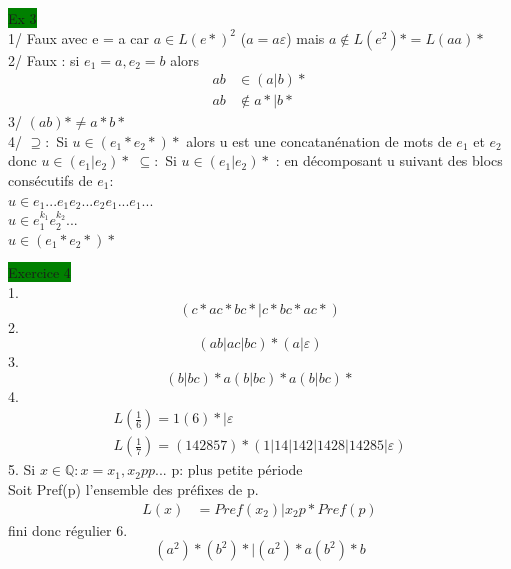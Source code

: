 \documentclass{article}
\begin{document}
\noindent \colorbox{green}{Ex 3}\\
1/ Faux avec e = a car \(a \in L(e*)^2\) (\(a = a \varepsilon\))
mais \(a \notin L(e^2)* = L(aa)*\)\\
2/ Faux : si \(e_1 = a, e_2 = b\) alors \begin{align*}
    ab &\in (a|b)*\\
    ab &\notin a*|b*
\end{align*}
3/ \((ab)* \neq a*b*\)\\
4/ \(\supseteq :\) Si \(u \in (e_1* e_2*)*\)
alors u est une concatanénation de mots de \(e_1\)
et \(e_2\) donc \(u \in (e_1|e_2)*\)
\(\subseteq :\) Si \(u \in (e_1 |e_2)*\) : 
en décomposant u suivant des blocs consécutifs de \(e_1\): \\
\(u \in e_1...e_1e_2...e_2e_1...e_1...\)\\
\(u \in e_1^{k_1}e_2^{k_2}...\)\\
\(u \in (e_1*e_2*)*\)

\noindent \colorbox{green}{Exercice 4}\\
1. \begin{equation*}
    (c*ac*bc*|c*bc*ac*)
\end{equation*}
2. \begin{equation*}
    (ab|ac|bc)*(a|\varepsilon)
\end{equation*}
3. \begin{equation*}
    (b|bc)*a(b|bc)*a(b|bc)*
\end{equation*}
4. \begin{eqnarray*}
    L(\frac{1}{6}) = 1(6)*|\varepsilon\\
    L(\frac{1}{7}) = (142857)*(1|14|142|1428|14285|\varepsilon)
\end{eqnarray*}
5. Si \(x \in \mathbb{Q} : x=x_1, x_2 pp...\) p: plus petite période\\
Soit Pref(p) l'ensemble des préfixes de p.\begin{align*}
    L(x)&= Pref(x_2)|x_2p*Pref(p)
\end{align*}
fini donc régulier
6. \begin{equation*}
    (a^2)*(b^2)*|(a^2)*a(b^2)*b
\end{equation*}
\end{document}
